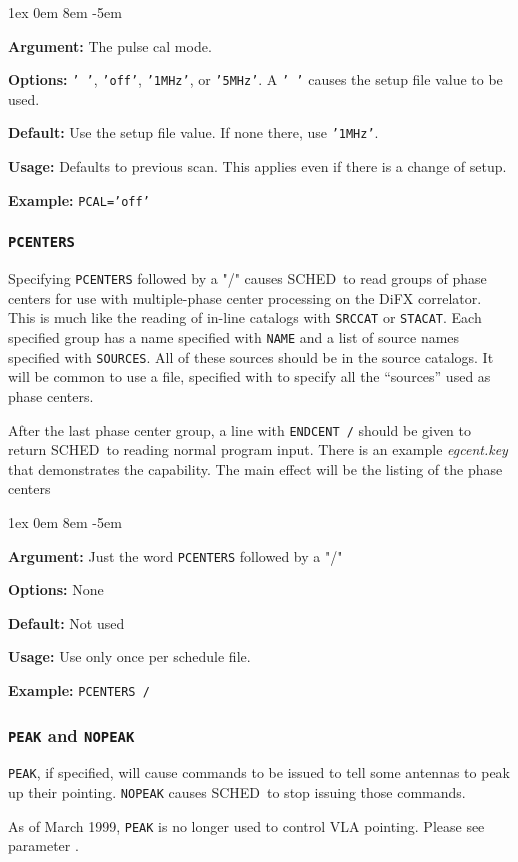 \documentclass{report}
\newcommand{\schedb}{{\sc SCHED~}}
\newcommand{\rcwbox}[5]{
  \begin{list}{}{\parsep 1ex  \itemsep 0em
                 \leftmargin 8em  \itemindent -5em }
    \item {\bf Argument:} #1
    \item {\bf Options:}  #2
    \item {\bf Default:}  #3
    \item {\bf Usage:}    #4
    \item {\bf Example:}  #5
  \end{list}
}
\begin{document}
\rcwbox
{The pulse cal mode.}
{{\tt ' '}, {\tt 'off'}, {\tt '1MHz'}, or {\tt '5MHz'}. A {\tt ' '}
causes the setup file value to be used.}
{Use the setup file value. If none there, use {\tt '1MHz'}.}
{Defaults to previous scan.  This applies even if there is a change
of setup.}
{{\tt PCAL='off'}}


\subsubsection{\label{MP:PCENTERS}{\tt PCENTERS}}

Specifying {\tt PCENTERS} followed by a "/" causes \schedb to read
groups of phase centers for use with multiple-phase center processing
on the DiFX correlator.  This is much like the reading of in-line
catalogs with {\tt SRCCAT} or {\tt STACAT}.  Each specified group has
a name specified with {\tt NAME} and a list of source names specified
with {\tt SOURCES}.  All of these sources should be in the source
catalogs.  It will be common to use a file, specified with
 to specify all the ``sources''
used as phase centers.

After the last phase center group, a line with
{\tt ENDCENT /} should be given to return \schedb to reading normal
program input.  There is an example {\sl egcent.key} that demonstrates
the capability.  The main effect will be the listing of the phase
centers

\rcwbox
{Just the word {\tt PCENTERS} followed by a "/"}
{None}
{Not used}
{Use only once per schedule file.}
{{\tt PCENTERS /}}


\subsubsection{\label{MP:PEAK}{\tt PEAK} and {\tt NOPEAK}}

{\tt PEAK}, if specified, will cause commands to be issued to tell
some antennas to peak up their pointing.  {\tt NOPEAK} causes
\schedb to stop issuing those commands.

As of March 1999, {\tt PEAK} is no longer used to control VLA
pointing.  Please see parameter .
\end{document}
